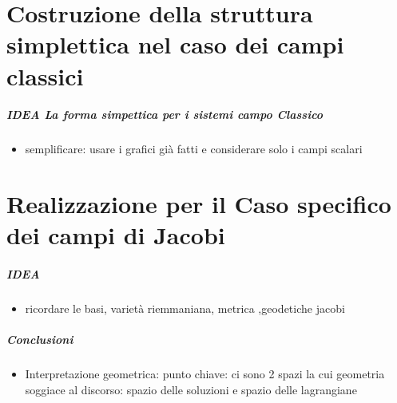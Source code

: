 \documentclass{beamer}
\begin{document}
	\part{Costruzione della struttura simplettica nel caso dei campi classici}
	\frame{\partpage}
	
	\begin{frame}
		\frametitle{ IDEA La forma simpettica per i sistemi campo Classico }
			\begin{itemize}
				\item semplificare: usare i grafici già fatti e considerare solo i campi scalari
			\end{itemize}
	\end{frame}
	
	
	\part{Realizzazione per il Caso specifico dei campi di Jacobi}
	\frame{\partpage}

	\begin{frame}
		\frametitle{ IDEA }
			\begin{itemize}
				\item ricordare le basi, varietà riemmaniana, metrica ,geodetiche jacobi
			\end{itemize}
	\end{frame}


	\begin{frame}
		\frametitle{ Conclusioni }
			\begin{itemize}
				\item Interpretazione geometrica: punto chiave: ci sono 2 spazi la cui geometria soggiace al discorso: spazio delle soluzioni e spazio delle lagrangiane
			\end{itemize}
	\end{frame}
	
\end{document}
